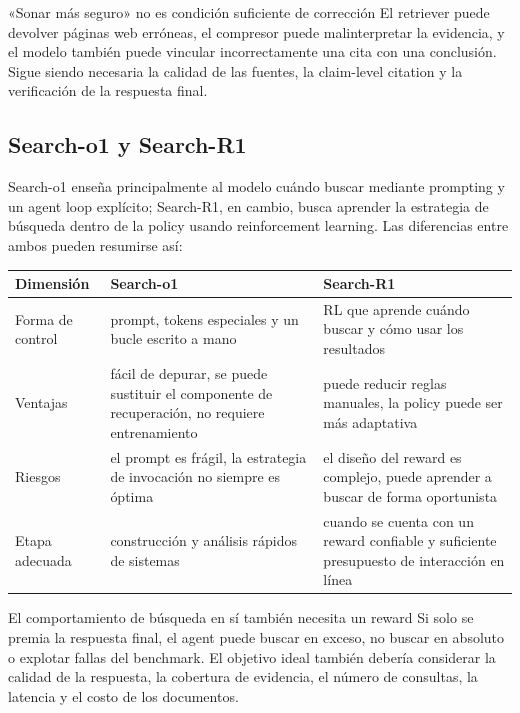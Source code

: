 \begin{warningbox}{«Sonar más seguro» no es condición suficiente de corrección}
El retriever puede devolver páginas web erróneas, el compresor puede malinterpretar la evidencia, y el modelo también puede vincular incorrectamente una cita con una conclusión. Sigue siendo necesaria la calidad de las fuentes, la claim-level citation y la verificación de la respuesta final.
\end{warningbox}

\subsection{Search-o1 y Search-R1}

Search-o1 enseña principalmente al modelo cuándo buscar mediante prompting y un agent loop explícito; Search-R1, en cambio, busca aprender la estrategia de búsqueda dentro de la policy usando reinforcement learning. Las diferencias entre ambos pueden resumirse así:

\begin{table}[H]
\centering
\small
\begin{tabular}{>{\raggedright\arraybackslash}p{3cm}>{\raggedright\arraybackslash}p{4.7cm}>{\raggedright\arraybackslash}p{4.7cm}}
\toprule
\textbf{Dimensión} & \textbf{Search-o1} & \textbf{Search-R1} \\
\midrule
Forma de control & prompt, tokens especiales y un bucle escrito a mano & RL que aprende cuándo buscar y cómo usar los resultados \\
Ventajas & fácil de depurar, se puede sustituir el componente de recuperación, no requiere entrenamiento & puede reducir reglas manuales, la policy puede ser más adaptativa \\
Riesgos & el prompt es frágil, la estrategia de invocación no siempre es óptima & el diseño del reward es complejo, puede aprender a buscar de forma oportunista \\
Etapa adecuada & construcción y análisis rápidos de sistemas & cuando se cuenta con un reward confiable y suficiente presupuesto de interacción en línea \\
\bottomrule
\end{tabular}
\end{table}

\begin{importantbox}{El comportamiento de búsqueda en sí también necesita un reward}
Si solo se premia la respuesta final, el agent puede buscar en exceso, no buscar en absoluto o explotar fallas del benchmark. El objetivo ideal también debería considerar la calidad de la respuesta, la cobertura de evidencia, el número de consultas, la latencia y el costo de los documentos.
\end{importantbox}

